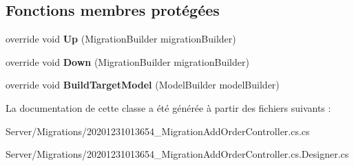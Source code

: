 \subsection*{Fonctions membres protégées}
\begin{DoxyCompactItemize}
\item 
\mbox{\label{class_mediwatch_1_1_server_1_1_migrations_1_1_migration_add_order_controllercs_a061f649bcd6f61d77909047605208583}} 
override void {\bfseries Up} (Migration\+Builder migration\+Builder)
\item 
\mbox{\label{class_mediwatch_1_1_server_1_1_migrations_1_1_migration_add_order_controllercs_ac860addfa1f2791ed46e8b75e56872ec}} 
override void {\bfseries Down} (Migration\+Builder migration\+Builder)
\item 
\mbox{\label{class_mediwatch_1_1_server_1_1_migrations_1_1_migration_add_order_controllercs_ae1363a71ba288c4ed3127a88d379cc35}} 
override void {\bfseries Build\+Target\+Model} (Model\+Builder model\+Builder)
\end{DoxyCompactItemize}


La documentation de cette classe a été générée à partir des fichiers suivants \+:\begin{DoxyCompactItemize}
\item 
Server/\+Migrations/20201231013654\+\_\+\+Migration\+Add\+Order\+Controller.\+cs.\+cs\item 
Server/\+Migrations/20201231013654\+\_\+\+Migration\+Add\+Order\+Controller.\+cs.\+Designer.\+cs\end{DoxyCompactItemize}
